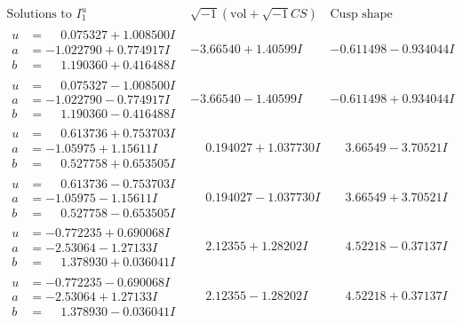 \documentclass[1p]{elsarticle_modified}
\theoremstyle{definition}
\newcommand{\I}{\sqrt{-1}}
\begin{document}
$$\begin{array}{c|c|c}  
\text{Solutions to }I^u_{1}& \I (\text{vol} + \sqrt{-1}CS) & \text{Cusp shape}\\
 \hline 
\begin{aligned}
u &= \phantom{-}0.075327 + 1.008500 I \\
a &= -1.022790 + 0.774917 I \\
b &= \phantom{-}1.190360 + 0.416488 I\end{aligned}
 & -3.66540 + 1.40599 I & -0.611498 - 0.934044 I \\ \hline\begin{aligned}
u &= \phantom{-}0.075327 - 1.008500 I \\
a &= -1.022790 - 0.774917 I \\
b &= \phantom{-}1.190360 - 0.416488 I\end{aligned}
 & -3.66540 - 1.40599 I & -0.611498 + 0.934044 I \\ \hline\begin{aligned}
u &= \phantom{-}0.613736 + 0.753703 I \\
a &= -1.05975 + 1.15611 I \\
b &= \phantom{-}0.527758 + 0.653505 I\end{aligned}
 & \phantom{-}0.194027 + 1.037730 I & \phantom{-}3.66549 - 3.70521 I \\ \hline\begin{aligned}
u &= \phantom{-}0.613736 - 0.753703 I \\
a &= -1.05975 - 1.15611 I \\
b &= \phantom{-}0.527758 - 0.653505 I\end{aligned}
 & \phantom{-}0.194027 - 1.037730 I & \phantom{-}3.66549 + 3.70521 I \\ \hline\begin{aligned}
u &= -0.772235 + 0.690068 I \\
a &= -2.53064 - 1.27133 I \\
b &= \phantom{-}1.378930 + 0.036041 I\end{aligned}
 & \phantom{-}2.12355 + 1.28202 I & \phantom{-}4.52218 - 0.37137 I \\ \hline\begin{aligned}
u &= -0.772235 - 0.690068 I \\
a &= -2.53064 + 1.27133 I \\
b &= \phantom{-}1.378930 - 0.036041 I\end{aligned}
 & \phantom{-}2.12355 - 1.28202 I & \phantom{-}4.52218 + 0.37137 I \\ \hline\begin{aligned}

\end{aligned}
\end{array}$$
\end{document}
